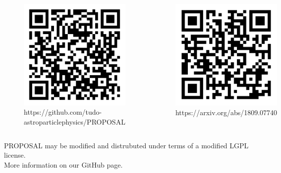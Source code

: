 \documentclass[aspectratio=1610, captions=tableheading, 11pt]{beamer}
\begin{document}
\begin{frame}[t]
  \vspace{-5mm}
  \begin{minipage}[t][0.8\textheight][t]{\textwidth}
      \begin{columns}
      \begin{figure}
          \centering
          \includegraphics[width=0.6\linewidth]{plots/github.pdf}
           \captionsetup{format=myformat}
          \caption*{https://github.com/tudo-\\astroparticlephysics/PROPOSAL}
      \end{figure}
      \begin{figure}
          \centering
          \includegraphics[width=0.6\linewidth]{plots/arxiv.pdf}
          \captionsetup{format=myformat}
          \caption*{https://arxiv.org/abs/1809.07740 \\ \phantom{astroparticlephysics/PROPOSAL}}
      \end{figure}
  \end{columns}
  \end{minipage}
  \vfill
  \begin{minipage}{\textwidth}
      \smaller
      \begin{center}
      PROPOSAL may be modified and distrubuted under terms of a modified LGPL license.\\More information on our GitHub page.
      \end{center}
  \end{minipage}
\end{frame}
\end{document}
